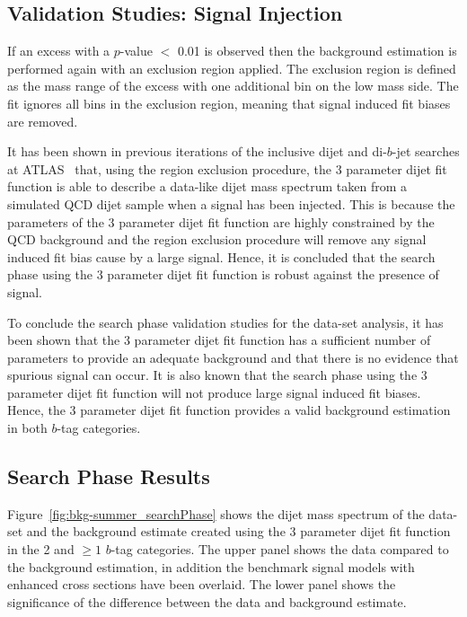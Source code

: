 \subsection{Validation Studies: Signal Injection}
\label{sec:bkg-summer_sigInj}

If an excess with a  \bh{} $p$-value $<$ 0.01 is observed then the background estimation is
performed again with an exclusion region applied.
The exclusion region is defined as the mass range of the excess with one additional bin on the low mass side.
The fit ignores all bins in the exclusion region, meaning that signal induced fit biases are removed.

It has been shown in previous iterations of the inclusive dijet and di-$b$-jet searches at ATLAS~\cite{dijet-mori16_paper,dibjet-mori16_paper} that,
using the region exclusion procedure, the 3 parameter dijet fit function is able to describe a data-like dijet mass spectrum
taken from a simulated QCD dijet sample when a signal has been injected.
This is because the parameters of the 3 parameter dijet fit function are highly constrained by the QCD background
and the region exclusion procedure will remove any signal induced fit bias cause by a large signal.
Hence, it is concluded that the search phase using the 3 parameter dijet fit function is robust against the presence of signal.

To conclude the search phase validation studies for the \summer{} data-set analysis,
it has been shown that the 3 parameter dijet fit function has a
sufficient number of parameters to provide an adequate background
and that there is no evidence that spurious signal can occur.
It is also known that the search phase using the 3 parameter dijet fit function
will not produce large signal induced fit biases.
Hence, the 3 parameter dijet fit function
provides a valid background estimation in both $b$-tag categories.


\clearpage

\subsection{Search Phase Results}
\label{sec:bkg-summer_results}

Figure~\ref{fig:bkg-summer_searchPhase} shows the dijet mass spectrum of the
\summer{} data-set and the background estimate created using the 3 parameter dijet fit function
in the 2 and $\geq1$ $b$-tag categories.
The upper panel shows the data compared to the background estimation,
in addition the benchmark signal models with enhanced cross sections have been overlaid.
The lower panel shows the significance of the difference between the data and background estimate.

